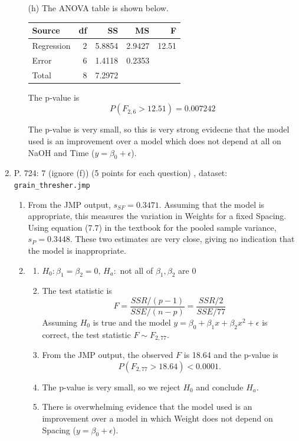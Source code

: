 \documentclass{article}\usepackage[]{graphicx}\usepackage[]{color}
\begin{document}
\begin{enumerate}
\begin{itemize}
  \item[(h)] The ANOVA table is shown below.
  
  \begin{center}
  \begin{tabular}{lrrrr}
  \hline
  Source & df & SS & MS & F \\ \hline
  Regression & 2 & 5.8854 & 2.9427 & 12.51\\
  Error & 6 & 1.4118 & 0.2353 &\\ \hline
  Total & 8 & 7.2972 & & \\ \hline
  \end{tabular}
  \end{center}
  
  The p-value is
  \[P(F_{2, 6} > 12.51) = 0.007242\]
  
  The p-value is very small, so this is very strong evidecne that the model used is an improvement over a model which does not depend at all on NaOH and Time ($y = \beta_0 + \epsilon$).
  
	\end{itemize}
	
	
	\item P. 724: 7 (ignore (f)) (5 points for each question) , dataset: {\tt grain\_thresher.jmp} 
	

	
	\begin{enumerate}
	\item
	From the JMP output, $s_{SF} = 0.3471$. Assuming that the model is appropriate, this measures the variation in Weights for a fixed Spacing. Using equation (7.7) in the textbook for the pooled sample variance, $s_{P} = 0.3448$. These two estimates are very close, giving no indication that the model is inappropriate.
	
	\item
	\begin{enumerate}[label = \arabic*.]
	\item
	$H_0: \beta_1 = \beta_2  = 0,\, H_a: $ not all of $\beta_1, \beta_2$ are 0
	\item
	The test statistic is
	\[F = \frac{SSR/(p-1)}{SSE/(n - p)} = \frac{SSR/2}{SSE/77}\]
	Assuming $H_0$ is true and the model $y = \beta_0 + \beta_1 x + \beta_2 x^2 + \epsilon$ is correct, the test statistic $F \sim F_{2, 77}$.
	\item
	From the JMP output, the observed $F$ is 18.64 and the p-value is 
	\[P(F_{2, 77} > 18.64) < 0.0001.\]
	\item
	The p-value is very small, so we reject $H_0$ and conclude $H_a$.
	\item
	There is overwhelming evidence that the model used is an improvement over a model in which Weight does not depend on Spacing ($y = \beta_0 + \epsilon$).
	\end{enumerate}
	

\end{enumerate}
\end{enumerate}
\end{document}
